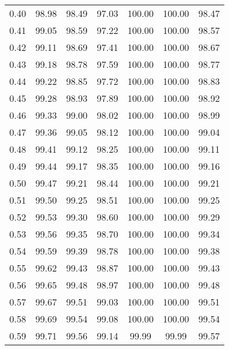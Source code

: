 \begin{tabular}{|c|c|c|c|c|c|c|}
      0.40 &     98.98 &     98.49 &      97.03 &  100.00 &     100.00 &         98.47 \\
      0.41 &     99.05 &     98.59 &      97.22 &  100.00 &     100.00 &         98.57 \\
      0.42 &     99.11 &     98.69 &      97.41 &  100.00 &     100.00 &         98.67 \\
      0.43 &     99.18 &     98.78 &      97.59 &  100.00 &     100.00 &         98.77 \\
      0.44 &     99.22 &     98.85 &      97.72 &  100.00 &     100.00 &         98.83 \\
      0.45 &     99.28 &     98.93 &      97.89 &  100.00 &     100.00 &         98.92 \\
      0.46 &     99.33 &     99.00 &      98.02 &  100.00 &     100.00 &         98.99 \\
      0.47 &     99.36 &     99.05 &      98.12 &  100.00 &     100.00 &         99.04 \\
      0.48 &     99.41 &     99.12 &      98.25 &  100.00 &     100.00 &         99.11 \\
      0.49 &     99.44 &     99.17 &      98.35 &  100.00 &     100.00 &         99.16 \\
      0.50 &     99.47 &     99.21 &      98.44 &  100.00 &     100.00 &         99.21 \\
      0.51 &     99.50 &     99.25 &      98.51 &  100.00 &     100.00 &         99.25 \\
      0.52 &     99.53 &     99.30 &      98.60 &  100.00 &     100.00 &         99.29 \\
      0.53 &     99.56 &     99.35 &      98.70 &  100.00 &     100.00 &         99.34 \\
      0.54 &     99.59 &     99.39 &      98.78 &  100.00 &     100.00 &         99.38 \\
      0.55 &     99.62 &     99.43 &      98.87 &  100.00 &     100.00 &         99.43 \\
      0.56 &     99.65 &     99.48 &      98.97 &  100.00 &     100.00 &         99.48 \\
      0.57 &     99.67 &     99.51 &      99.03 &  100.00 &     100.00 &         99.51 \\
      0.58 &     99.69 &     99.54 &      99.08 &  100.00 &     100.00 &         99.54 \\
      0.59 &     99.71 &     99.56 &      99.14 &   99.99 &      99.99 &         99.57 \\

\end{tabular}
